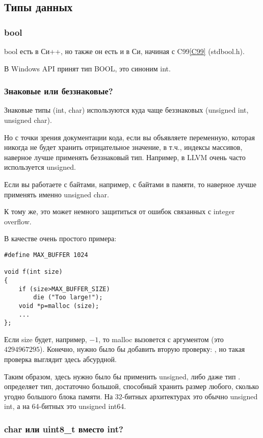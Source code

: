 ﻿\subsection{Типы данных}

\subsubsection{bool}

bool есть в Си++, но также он есть и в Си, начиная с C99\ref{C99} (stdbool.h).

В Windows API принят тип BOOL, это синоним int.

\subsubsection{Знаковые или беззнаковые?}

Знаковые типы (int, char) используются куда чаще беззнаковых (unsigned int, unsigned char).

Но с точки зрения документации кода, если вы объявляете переменную, которая никогда не будет хранить отрицательное
значение, в т.ч., индексы массивов, наверное лучше применять беззнаковый тип.
Например, в LLVM очень часто используется unsigned.

Если вы работаете с байтами, например, с байтами в памяти, то наверное лучше применять именно unsigned char.

К тому же, это может немного защититься от ошибок связанных с integer overflow\cite{Phrack3C0A}.

В качестве очень простого примера:

\begin{lstlisting}
#define MAX_BUFFER 1024

void f(int size)
{
	if (size>MAX_BUFFER_SIZE)
		die ("Too large!");
	void *p=malloc (size);
	...
};
\end{lstlisting}

Если size будет, например, $-1$, то malloc вызовется с аргументом  (это $4294967295$).
Конечно, нужно было бы добавить вторую проверку: , но такая проверка выглядит здесь абсурдной.

Таким образом, здесь нужно было бы применить unsigned, либо даже тип . 
 определяет тип, достаточно большой,
способный хранить размер любого, сколько угодно большого блока памяти.
На 32-битных архитектурах это обычно unsigned int,
а на 64-битных это unsigned int64.

\subsubsection{char или uint8\_t вместо int?}

